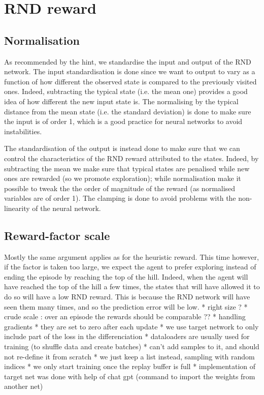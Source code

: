 \documentclass[a4paper, 12pt,oneside]{article}
\begin{document}
        \section{RND reward}
            \subsection{Normalisation} 
            As recommended by the hint, we standardise the input and output of the RND network. The input standardisation is done since we want to output to vary as a function of how different the observed state is compared to the previously visited ones. Indeed, subtracting the typical state (i.e. the mean one) provides a good idea of how different the new input state is. The normalising by the typical distance from the mean state (i.e. the standard deviation) is done to make sure the input is of order 1, which is a good practice for neural networks to avoid instabilities.
            
            The standardisation of the output is instead done to make sure that we can control the characteristics of the RND reward attributed to the states. Indeed, by subtracting the mean we make sure that typical states are penalised  while new ones are rewarded (so we promote exploration); while normalisation make it possible to tweak the the order of magnitude of the reward (as normalised variables are of order 1). The clamping is done to avoid problems with the non-linearity of the neural network. 
            \subsection{Reward-factor scale}
            Mostly the same argument applies as for the heuristic reward. This time however, if the factor is taken too large, we expect the agent to prefer exploring instead of ending the episode by reaching the top of the hill. Indeed, when the agent will have reached the top of the hill a few times, the states that will have allowed it to do so will have a low RND reward. This is because the RND network will have seen them many times, and so the prediction error will be low.
            * right size ?
            * crude scale : over an episode the rewards should be comparable ?? 
            * handling gradients 
            * they are set to zero after each update
            * we use target network to only include part of the loss in the differenciation 
          * dataloaders are usually used for training (to shuffle data and create batches)
            * can't add samples to it, and should not re-define it from scratch 
              * we just keep a list instead, sampling with random indices 
          * we only start training once the replay buffer is full 
          * implementation of target net was done with help of chat gpt (command to import the weights from another net)
\end{document}
